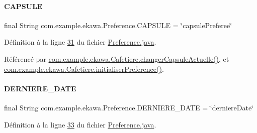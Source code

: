 \mbox{\label{classcom_1_1example_1_1ekawa_1_1_preference_a64416823eba6f35e817636b31cb12265}} 
\paragraph{\texorpdfstring{C\+A\+P\+S\+U\+LE}{CAPSULE}}
{\footnotesize\ttfamily final String com.\+example.\+ekawa.\+Preference.\+C\+A\+P\+S\+U\+LE = \char`\"{}capsule\+Preferee\char`\"{}\hspace{0.3cm}{\ttfamily [static]}}



Définition à la ligne \hyperlink{_preference_8java_source_l00031}{31} du fichier \hyperlink{_preference_8java_source}{Preference.\+java}.



Référencé par \hyperlink{_cafetiere_8java_source_l00212}{com.\+example.\+ekawa.\+Cafetiere.\+changer\+Capsule\+Actuelle()}, et \hyperlink{_cafetiere_8java_source_l00122}{com.\+example.\+ekawa.\+Cafetiere.\+initialiser\+Preference()}.

\mbox{\label{classcom_1_1example_1_1ekawa_1_1_preference_a70095b2dd8748ba4bae554ff09d75d52}} 
\paragraph{\texorpdfstring{D\+E\+R\+N\+I\+E\+R\+E\+\_\+\+D\+A\+TE}{DERNIERE\_DATE}}
{\footnotesize\ttfamily final String com.\+example.\+ekawa.\+Preference.\+D\+E\+R\+N\+I\+E\+R\+E\+\_\+\+D\+A\+TE = \char`\"{}derniere\+Date\char`\"{}\hspace{0.3cm}{\ttfamily [static]}}



Définition à la ligne \hyperlink{_preference_8java_source_l00033}{33} du fichier \hyperlink{_preference_8java_source}{Preference.\+java}.



